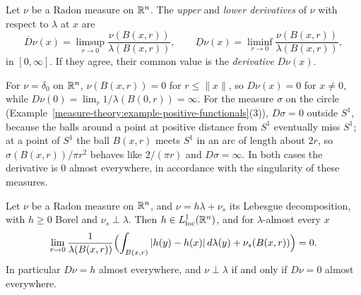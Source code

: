 \begin{definition}\label{measure-theory:definition-derivative-measure}
Let $\nu$ be a Radon measure on $\mathbb{R}^n$. The \emph{upper} and \emph{lower derivatives} of $\nu$ with respect to $\lambda$ at $x$ are
\[
\overline{D}\nu(x) = \limsup_{r \to 0}\frac{\nu(B(x, r))}{\lambda(B(x, r))}, \qquad \underline{D}\nu(x) = \liminf_{r \to 0}\frac{\nu(B(x, r))}{\lambda(B(x, r))},
\]
in $[0, \infty]$. If they agree, their common value is the \emph{derivative} $D\nu(x)$.
\end{definition}

\begin{example}\label{measure-theory:example-derivative-measure}
For $\nu = \delta_0$ on $\mathbb{R}^n$, $\nu(B(x, r)) = 0$ for $r \leq \|x\|$, so $D\nu(x) = 0$ for $x \neq 0$, while $D\nu(0) = \lim_r1/\lambda(B(0, r)) = \infty$. For the measure $\sigma$ on the circle
(Example~\ref{measure-theory:example-positive-functionals}(3)), $D\sigma = 0$ outside $S^1$, because the balls around a point at positive distance from $S^1$ eventually miss $S^1$; at a point of $S^1$ the ball
$B(x, r)$ meets $S^1$ in an arc of length about $2r$, so $\sigma(B(x, r))/\pi r^2$ behaves like $2/(\pi r)$ and $D\sigma = \infty$. In both cases the derivative is $0$ almost everywhere, in accordance
with the singularity of these measures.
\end{example}

\begin{theorem}\label{measure-theory:theorem-differentiation-measures}
Let $\nu$ be a Radon measure on $\mathbb{R}^n$, and $\nu = h\lambda + \nu_s$ its Lebesgue decomposition, with $h \geq 0$ Borel and $\nu_s \perp \lambda$. Then $h \in L^1_{\mathrm{loc}}(\mathbb{R}^n)$, and for
$\lambda$-almost every $x$
\[
\lim_{r \to 0}\frac1{\lambda(B(x, r))}\Bigl(\int_{B(x, r)}|h(y) - h(x)|\,d\lambda(y) + \nu_s(B(x, r))\Bigr) = 0 .
\]
In particular $D\nu = h$ almost everywhere, and $\nu \perp \lambda$ if and only if $D\nu = 0$ almost everywhere.
\end{theorem}

